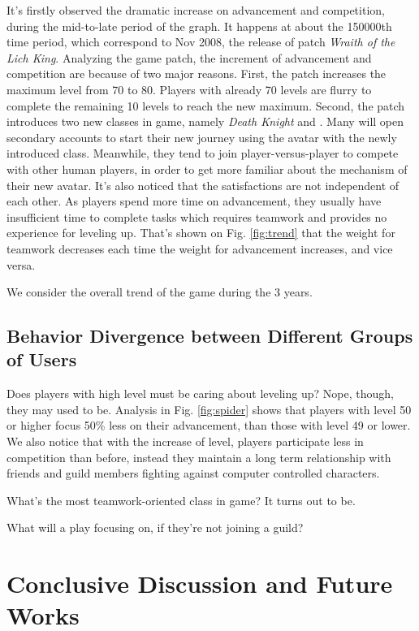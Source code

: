 \documentclass{sigchi}
\begin{document}
It's firstly observed the dramatic increase on advancement and competition, during the mid-to-late period of the graph.
It happens at about the 150000th time period, which correspond to Nov 2008, the release of patch \textit{Wraith of the Lich King}.
Analyzing the game patch, the increment of advancement and competition are because of two major reasons.
First, the patch increases the maximum level from 70 to 80.
Players with already 70 levels are flurry to complete the remaining 10 levels to reach the new maximum.
Second, the patch introduces two new classes in game, namely \textit{Death Knight} and \textit{}.
Many will open secondary accounts to start their new journey using the avatar with the newly introduced class.
Meanwhile, they tend to join player-versus-player to compete with other human players, in order to get more familiar about the mechanism of their new avatar.
It's also noticed that the satisfactions are not independent of each other.
As players spend more time on advancement, they usually have insufficient time to complete tasks which requires teamwork and provides no experience for leveling up.
That's shown on Fig. \ref{fig:trend} that the weight for teamwork decreases each time the weight for advancement increases, and vice versa.

We consider the overall trend of the game during the 3 years.


\subsection{Behavior Divergence between Different Groups of Users}

Does players with high level must be caring about leveling up?
Nope, though, they may used to be.
Analysis in Fig. \ref{fig:spider} shows that players with level 50 or higher focus 50\% less on their advancement, than those with level 49 or lower.
We also notice that with the increase of level, players participate less in competition than before, instead they maintain a long term relationship with friends and guild members fighting against computer controlled characters.

What's the most teamwork-oriented class in game?
It turns out to be.

What will a play focusing on, if they're not joining a guild?

\section{Conclusive Discussion and Future Works}
\end{document}
